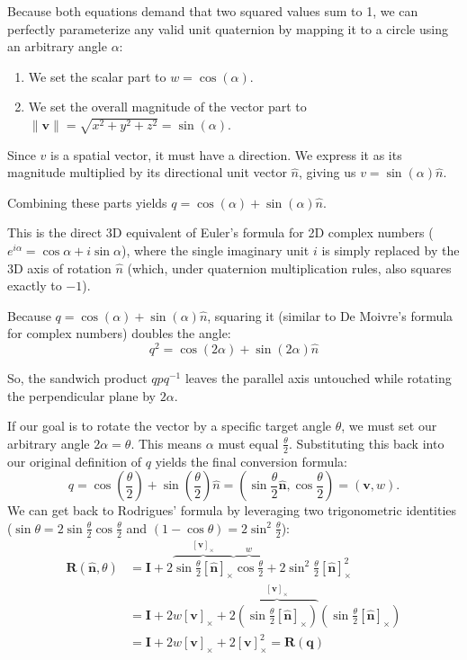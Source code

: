 Because both equations demand that two squared values sum to 1, we can perfectly parameterize any valid unit quaternion by mapping it to a circle using an arbitrary angle $\alpha$:
\begin{enumerate}
\item We set the scalar part to $w = \cos(\alpha)$.
\item We set the overall magnitude of the vector part to $\| \mathbf{v} \| = \sqrt{ x^2 + y^2 + z^2 }  = \sin(\alpha)$.
\end{enumerate}

Since $v$ is a spatial vector, it must have a direction. We express it as its magnitude multiplied by its directional unit vector $\hat{n}$, giving us $v = \sin(\alpha)\hat{n}$.

Combining these parts yields $q = \cos(\alpha) + \sin(\alpha)\hat{n}$. 

\begin{observation}{}
    This is the direct 3D equivalent of Euler's formula for 2D complex numbers ($e^{i\alpha} = \cos\alpha + i\sin\alpha$), where the single imaginary unit $i$ is simply replaced by the 3D axis of rotation $\hat{n}$ (which, under quaternion multiplication rules, also squares exactly to $-1$).
\end{observation}

Because $q = \cos(\alpha) + \sin(\alpha)\hat{n}$, squaring it (similar to De Moivre's formula for complex numbers) doubles the angle:
$$q^2 = \cos(2\alpha) + \sin(2\alpha)\hat{n}$$

So, the sandwich product $q p q^{-1}$ leaves the parallel axis untouched while rotating the perpendicular plane by $2\alpha$.

If our goal is to rotate the vector by a specific target angle $\theta$, we must set our arbitrary angle $2\alpha = \theta$. This means $\alpha$ must equal $\frac{\theta}{2}$. Substituting this back into our original definition of $q$ yields the final conversion formula:
$$q = \cos\left(\frac{\theta}{2}\right) + \sin\left(\frac{\theta}{2}\right)\hat{n}=\left( \sin \frac{\theta}{2}\hat{\mathbf{n}},\cos \frac{\theta}{2} \right)=(\mathbf{v},w).$$
We can get back to Rodrigues' formula by leveraging two trigonometric identities ($\sin \theta=2\sin \frac{\theta}{2}\cos \frac{\theta}{2}$ and $(1-\cos \theta)=2\sin^{2} \frac{\theta}{2}$):
$$\begin{aligned}
\mathbf{R}(\hat{\mathbf{n}}, \theta) &= \mathbf{I} + 2\overbrace{\sin \frac{\theta}{2} [\hat{\mathbf{n}}]_{\times}}^{[\mathbf{v}]_{\times}} \overbrace{\cos \frac{\theta}{2}}^{w} + 2\sin^2 \frac{\theta}{2}[\hat{\mathbf{n}}]_{\times}^2 \\
&=\mathbf{I} + 2w[\mathbf{v}]_{\times} + 2\overbrace{\left(\sin \frac{\theta}{2}[\hat{\mathbf{n}}]_{\times}\right)}^{[\mathbf{v}]_{\times}}\left(\sin \frac{\theta}{2}[\hat{\mathbf{n}}]_{\times}\right) \\
&=\mathbf{I} + 2w[\mathbf{v}]_{\times} + 2[\mathbf{v}]^2_{\times} = \mathbf{R}(\mathbf{q})
\end{aligned}$$

